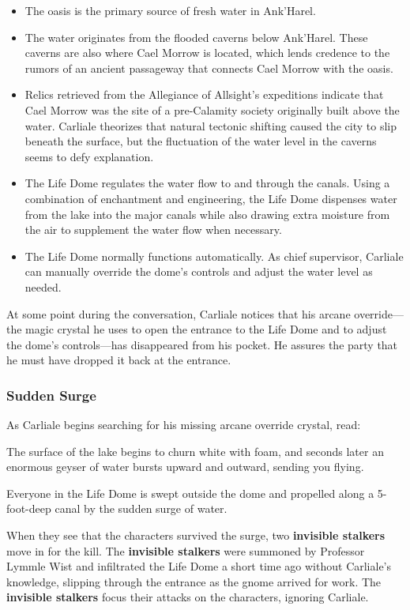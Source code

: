 \documentclass[a4paper, 11pt, bg=full, twocolumn, nooutline]{dndbook}
\begin{document}
\begin{itemize}
\item The oasis is the primary source of fresh water in Ank'Harel.
\item The water originates from the flooded caverns below Ank'Harel. These caverns are also where Cael Morrow is located, which lends credence to the rumors of an ancient passageway that connects Cael Morrow with the oasis.
\item Relics retrieved from the Allegiance of Allsight's expeditions indicate that Cael Morrow was the site of a pre-Calamity society originally built above the water. Carliale theorizes that natural tectonic shifting caused the city to slip beneath the surface, but the fluctuation of the water level in the caverns seems to defy explanation.
\item The Life Dome regulates the water flow to and through the canals. Using a combination of enchantment and engineering, the Life Dome dispenses water from the lake into the major canals while also drawing extra moisture from the air to supplement the water flow when necessary.
\item The Life Dome normally functions automatically. As chief supervisor, Carliale can manually override the dome's controls and adjust the water level as needed.
\end{itemize}

At some point during the conversation, Carliale notices that his arcane override---the magic crystal he uses to open the entrance to the Life Dome and to adjust the dome's controls---has disappeared from his pocket. He assures the party that he must have dropped it back at the entrance.

\subsubsection{Sudden Surge}

As Carliale begins searching for his missing arcane override crystal, read:

\begin{DndReadAloud}
The surface of the lake begins to churn white with foam, and seconds later an enormous geyser of water bursts upward and outward, sending you flying.
\end{DndReadAloud}

Everyone in the Life Dome is swept outside the dome and propelled along a 5-foot-deep canal by the sudden surge of water.

When they see that the characters survived the surge, two \textbf{invisible stalkers} move in for the kill. The \textbf{invisible stalkers} were summoned by Professor Lymmle Wist and infiltrated the Life Dome a short time ago without Carliale's knowledge, slipping through the entrance as the gnome arrived for work. The \textbf{invisible stalkers} focus their attacks on the characters, ignoring Carliale.
\end{document}
